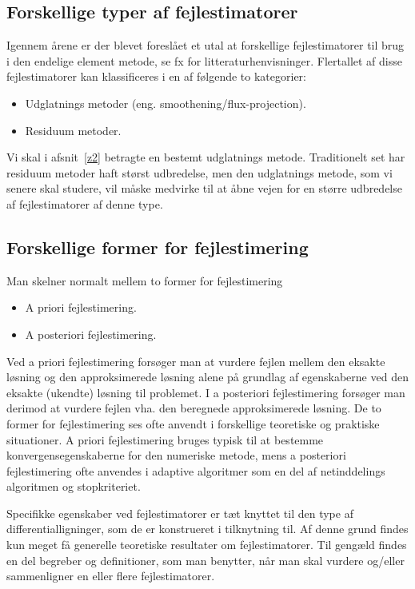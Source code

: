 \subsection{Forskellige typer af fejlestimatorer}
Igennem årene er der blevet foreslået et utal at forskellige 
fejlestimatorer til brug i den endelige element metode, se fx
\cite{babuska1} for 
litteraturhenvisninger. Flertallet af disse fejlestimatorer kan 
klassificeres i en af følgende to kategorier:
\begin{itemize}
  \item Udglatnings metoder (eng. smoothening/flux-projection).
  \item Residuum metoder.
\end{itemize}
Vi skal i afsnit~\ref{z2} betragte en bestemt udglatnings metode.
Traditionelt set har residuum metoder haft størst udbredelse, men den
udglatnings metode, som vi senere skal studere, vil måske medvirke til at åbne
vejen for en større udbredelse af fejlestimatorer af denne type.
 
\subsection{Forskellige former for fejlestimering}
Man skelner normalt mellem to former for fejlestimering
\begin{itemize}
  \item A priori fejlestimering.
  \item A posteriori fejlestimering.
\end{itemize}
Ved a priori fejlestimering forsøger man at vurdere fejlen mellem den
eksakte løsning og den approksimerede løsning alene på grundlag af
egenskaberne ved den eksakte (ukendte) løsning til problemet. I a 
posteriori fejlestimering forsøger man derimod at vurdere fejlen vha. 
den beregnede approksimerede løsning. De to former for fejlestimering 
ses ofte anvendt i forskellige teoretiske og praktiske situationer. A
priori fejlestimering bruges typisk til at bestemme 
konvergensegenskaberne for den numeriske metode, mens a posteriori
fejlestimering ofte anvendes i adaptive algoritmer som en del af
netinddelings algoritmen og stopkriteriet.

Specifikke egenskaber ved fejlestimatorer er tæt knyttet til den 
type af differentialligninger, som de er konstrueret i tilknytning til. 
Af denne grund findes kun  meget få generelle teoretiske resultater om
fejlestimatorer. Til gengæld findes en del begreber og definitioner,
som man benytter, når man skal vurdere og/eller sammenligner en eller
flere fejlestimatorer. 

